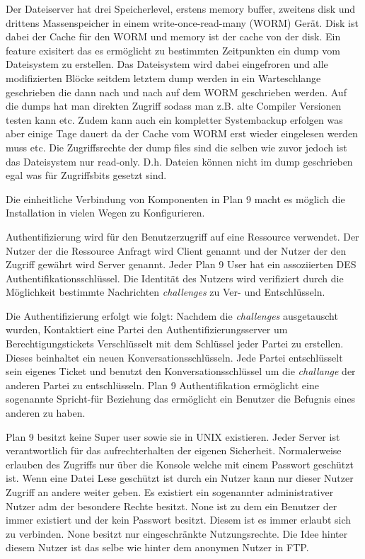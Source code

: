 \documentclass[9pt,technote]{IEEEtran}
\begin{document}
        Der Dateiserver hat drei Speicherlevel, erstens memory buffer, zweitens disk und drittens Massenspeicher in einem write-once-read-many (WORM) Ger\"at. 
        Disk ist dabei der Cache f\"ur den WORM und memory ist der cache von der disk. Ein feature exisitert das es erm\"oglicht zu bestimmten Zeitpunkten ein dump vom
        Dateisystem zu erstellen. Das Dateisystem wird dabei eingefroren und alle modifizierten Bl\"ocke seitdem letztem dump werden in ein Warteschlange geschrieben
        die dann nach und nach auf dem WORM geschrieben werden. Auf die dumps hat man direkten Zugriff sodass man z.B.  alte Compiler Versionen testen kann etc.
        Zudem kann auch ein kompletter Systembackup erfolgen was aber einige Tage dauert da der Cache vom WORM erst wieder eingelesen werden muss etc.
        Die Zugriffsrechte der dump files sind die selben wie zuvor jedoch ist das Dateisystem nur read-only. D.h. Dateien k\"onnen nicht im dump geschrieben egal
        was f\"ur Zugriffsbits gesetzt sind.
        
        Die einheitliche Verbindung von Komponenten in Plan 9 macht es m\"oglich die Installation in vielen Wegen zu Konfigurieren.
        
        Authentifizierung wird f\"ur den Benutzerzugriff auf eine Ressource verwendet. Der Nutzer der die Ressource Anfragt wird Client genannt und der
        Nutzer der den Zugriff gew\"ahrt wird Server genannt. Jeder Plan 9 User hat ein assoziierten DES Authentifikationsschl\"ussel. Die Identit\"at
        des Nutzers wird verifiziert durch die M\"oglichkeit bestimmte Nachrichten \textit{challenges} zu Ver- und Entschl\"usseln.
        
        Die Authentifizierung erfolgt wie folgt: Nachdem die \textit{challenges} ausgetauscht wurden, Kontaktiert eine Partei  den Authentifizierungsserver um Berechtigungstickets Verschl\"usselt
        mit dem Schl\"ussel jeder Partei zu erstellen. Dieses beinhaltet ein neuen Konversationsschl\"usseln. Jede Partei entschl\"usselt sein eigenes Ticket und benutzt den Konversationsschl\"ussel
       um die \textit{challange} der anderen Partei zu entschl\"usseln. Plan 9 Authentifikation erm\"oglicht eine sogenannte Spricht-f\"ur Beziehung das erm\"oglicht ein Benutzer
       die Befugnis eines anderen zu haben.
       
       Plan 9 besitzt keine Super user sowie sie in UNIX existieren. Jeder Server ist verantwortlich f\"ur das aufrechterhalten der eigenen Sicherheit.
       Normalerweise erlauben des Zugriffs nur \"uber die Konsole welche mit einem Passwort gesch\"utzt ist. Wenn eine Datei Lese gesch\"utzt ist durch ein Nutzer kann
       nur dieser Nutzer Zugriff an andere weiter geben. Es existiert ein sogenannter administrativer Nutzer adm der besondere Rechte besitzt. None ist zu dem ein Benutzer
       der immer existiert und der kein Passwort besitzt. Diesem ist es immer erlaubt sich zu verbinden. None besitzt nur eingeschr\"ankte Nutzungsrechte.
       Die Idee hinter diesem Nutzer ist das selbe wie hinter dem anonymen Nutzer in FTP.
       
\end{document}
